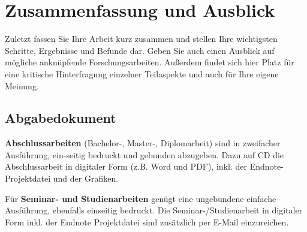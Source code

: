\section{Zusammenfassung und Ausblick}
\label{cha:fazit}
Zuletzt fassen Sie Ihre Arbeit kurz zusammen und stellen Ihre wichtigsten Schritte, Ergebnisse und Befunde dar. Geben Sie auch einen Ausblick auf mögliche anknüpfende Forschungsarbeiten. Außerdem findet sich hier Platz für eine kritische Hinterfragung einzelner Teilaspekte und auch für Ihre eigene Meinung.

\subsection{Abgabedokument}
\textbf{Abschlussarbeiten} (Bachelor-, Master-, Diplomarbeit) sind in zweifacher Ausführung, ein-seitig bedruckt und gebunden abzugeben. Dazu auf CD die Abschlussarbeit in digitaler Form (z.B. Word und PDF), inkl. der Endnote-Projektdatei und der Grafiken. \par\medskip
Für \textbf{Seminar- und Studienarbeiten} genügt eine ungebundene einfache Ausführung, ebenfalls einseitig bedruckt. Die Seminar-/Studienarbeit in digitaler Form inkl. der Endnote Projektdatei sind zusätzlich per E-Mail einzureichen.
